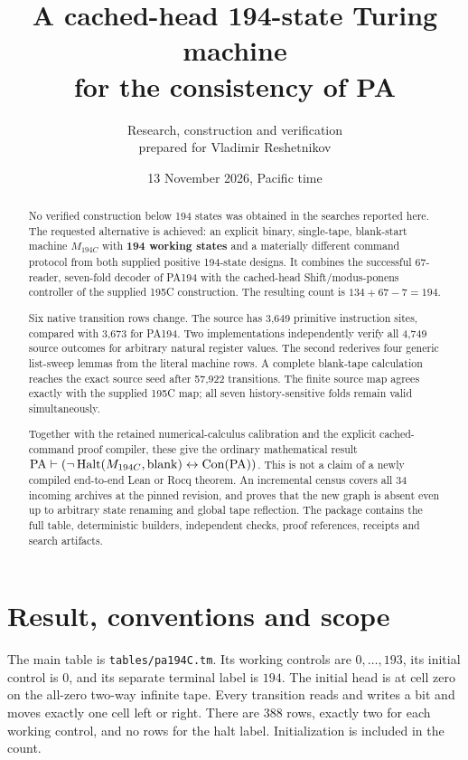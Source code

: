 \documentclass[11pt,letterpaper]{article}
\title{A cached-head 194-state Turing machine\\for the consistency of PA}
\author{Research, construction and verification\\prepared for Vladimir Reshetnikov}
\date{13 November 2026, Pacific time}
\newcommand{\PA}{\mathrm{PA}}\newcommand{\Con}{\operatorname{Con}}
\newcommand{\MC}{M_{194C}}\newcommand{\MS}{M_{194}}
\newcommand{\file}[1]{\texttt{\nolinkurl{#1}}}
\begin{document}
\maketitle
\begin{abstract}
No verified construction below 194 states was obtained in the searches reported here.
The requested alternative is achieved: an explicit binary, single-tape, blank-start
machine $\MC$ with \textbf{194 working states} and a materially different
command protocol from both supplied positive 194-state designs.
It combines the successful 67-reader, seven-fold decoder of PA194 with the
cached-head Shift/modus-ponens controller of the supplied 195C construction.
The resulting count is $134+67-7=194$.

Six native transition rows change. The source has 3,649 primitive instruction
sites, compared with 3,673 for PA194. Two implementations independently verify
all 4,749 source outcomes for arbitrary natural register values. The second
rederives four generic list-sweep lemmas from the literal machine rows.
A complete blank-tape calculation reaches the exact source seed after
57,922 transitions. The finite source map agrees exactly with the supplied
195C map; all seven history-sensitive folds remain valid simultaneously.

Together with the retained numerical-calculus calibration and the explicit
cached-command proof compiler, these give the ordinary mathematical result
$\PA\vdash(\neg\Halt(\MC,\mathrm{blank})\leftrightarrow\Con(\PA))$.
This is not a claim of a newly compiled end-to-end Lean or Rocq theorem.
An incremental census covers all 34 incoming archives at the pinned revision,
and proves that the new graph is absent even up to arbitrary state renaming
and global tape reflection. The package contains the full table, deterministic
builders, independent checks, proof references, receipts and search artifacts.
\end{abstract}
\clearpage\tableofcontents\clearpage

\section{Result, conventions and scope}

The main table is \file{tables/pa194C.tm}. Its working controls are
$0,\ldots,193$, its initial control is $0$, and its separate terminal label is
$194$. The initial head is at cell zero on the all-zero two-way infinite tape.
Every transition reads and writes a bit and moves exactly one cell left or
right. There are 388 rows, exactly two for each working control, and no rows
for the halt label. Initialization is included in the count.
\end{document}
